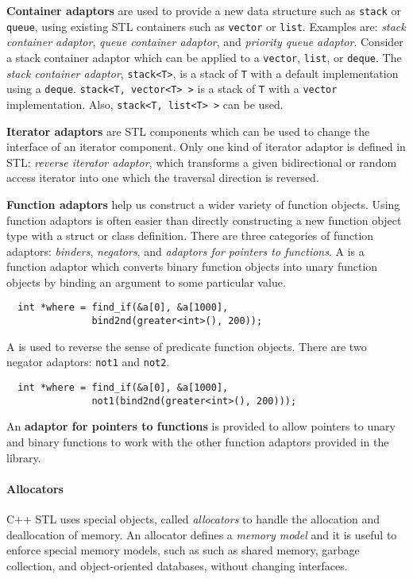 \documentclass{memo}
\begin{document}
{\bf Container adaptors} are used to provide a new data structure such as
\verb+stack+ or \verb+queue+, using existing STL containers such as
\verb+vector+ or \verb+list+. Examples are: {\em stack container adaptor},
     {\em queue container adaptor\/}, and {\em priority queue adaptor\/}. 
Consider a stack container adaptor which can be
applied to a \verb+vector+, \verb+list+, or \verb+deque+.
The {\em stack container adaptor}, \verb+stack<T>+, is a stack of \verb+T+
with a default implementation using a
\verb+deque+. \verb+stack<T, vector<T> >+ is a stack of \verb+T+ with a 
\verb+vector+ implementation. Also, \verb+stack<T, list<T> >+ can be used. 

{\bf Iterator adaptors} are STL components which can be used to change the
interface of an iterator component.  Only one kind of iterator adaptor is
defined in STL: {\em reverse iterator adaptor\/}, which transforms a given
bidirectional or random access iterator into one which the traversal direction
is reversed. 

{\bf Function adaptors} help us construct a wider variety of function
objects. Using function adaptors is often easier than directly constructing a
new function object type with a struct or class definition. There are three
categories of function adaptors: {\em binders\/}, {\em negators\/}, and {\em
  adaptors for pointers to functions\/}. A  is a function adaptor
which converts binary function objects into unary function objects by binding
an argument to some particular value.
\begin{verbatim}
  int *where = find_if(&a[0], &a[1000], 
               bind2nd(greater<int>(), 200));
\end{verbatim}
A  is used to reverse the sense of predicate function objects.
There are two negator adaptors: \verb+not1+ and \verb+not2+. 
\begin{verbatim}
  int *where = find_if(&a[0], &a[1000], 
               not1(bind2nd(greater<int>(), 200)));
\end{verbatim}
An {\bf adaptor for pointers to functions} is provided to allow pointers to
unary and binary functions to work with the other function adaptors provided
in the library. 

\paragraph{Allocators}
C++ STL uses special objects, called {\em allocators\/} to handle the
allocation and deallocation of memory. An allocator defines a {\em memory
  model\/} and it is useful to enforce special memory models, such as
such as shared memory, garbage collection, and object-oriented databases,
without changing interfaces.  
\end{document}
